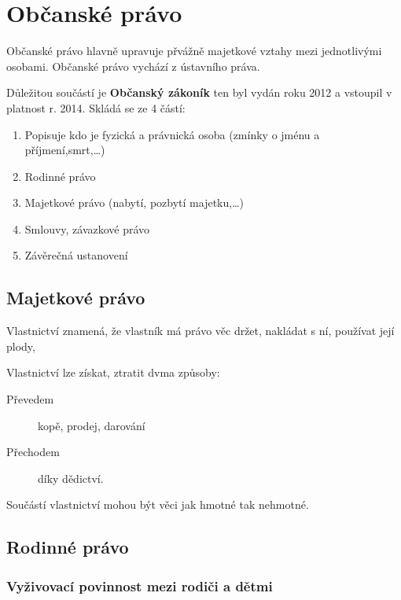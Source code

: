 \documentclass[10pt,a4paper,
twoside,%
]{report}
\begin{document}
\dotfill{} \vspace{0.2cm}

\dotfill{} \vspace{0.2cm}

\dotfill{} \vspace{0.2cm}

\dotfill{} \vspace{0.2cm}

\dotfill{} \vspace{0.2cm}


\chapter{Občanské právo}
Občanské právo hlavně upravuje přvážně majetkové vztahy mezi jednotlivými osobami. Občanské právo vychází z ústavního práva.

Důležitou součástí je \textbf{Občanský zákoník} ten byl vydán roku 2012 a vstoupil v platnost r. 2014. Skládá se ze 4 částí:\begin{enumerate}
\item Popisuje kdo je fyzická a právnická osoba (zmínky o jménu a příjmení,smrt,\dots)
\item Rodinné právo
\item Majetkové právo (nabytí, pozbytí majetku,\dots)
\item Smlouvy, závazkové právo
\item Závěrečná ustanovení
\end{enumerate}

\section{Majetkové právo}
Vlastnictví znamená, že vlastník má právo věc držet, nakládat s ní, používat její plody, 

Vlastnictví lze získat, ztratit dvma způsoby: \begin{description}
\item[Převedem]kopě, prodej, darování
\item[Přechodem] díky dědictví. 
\end{description}

Součástí vlastnictví mohou být věci jak hmotné tak nehmotné.

\section{Rodinné právo}

\subsection{Vyživovací povinnost mezi rodiči a dětmi}
\end{document}

